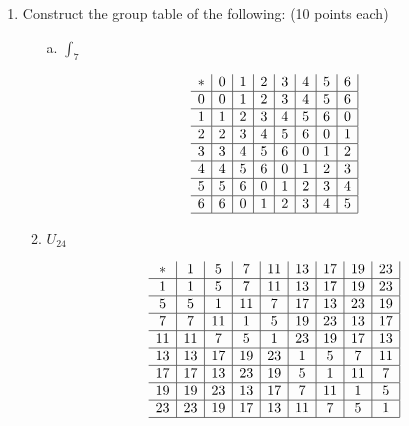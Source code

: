 \begin{enumerate}
\begin{enumerate}
    \end{enumerate}
    \item Construct the group table of the following: (10 points each)
    \begin{enumerate}
        \item[a.] \(\int_7\)

        \[
            \begin{array}{c|c|c|c|c|c|c|c|}
                * & 0 & 1 & 2 & 3 & 4 & 5 & 6 \\ \hline
                0 & 0 & 1 & 2 & 3 & 4 & 5 & 6 \\ \hline
                1 & 1 & 2 & 3 & 4 & 5 & 6 & 0 \\ \hline
                2 & 2 & 3 & 4 & 5 & 6 & 0 & 1 \\ \hline
                3 & 3 & 4 & 5 & 6 & 0 & 1 & 2 \\ \hline
                4 & 4 & 5 & 6 & 0 & 1 & 2 & 3 \\ \hline
                5 & 5 & 6 & 0 & 1 & 2 & 3 & 4 \\ \hline
                6 & 6 & 0 & 1 & 2 & 3 & 4 & 5 \\ \hline
            \end{array}
        \]

        \item \(U_{24}\)

        \[
            \begin{array}{c|c|c|c|c|c|c|c|c|}
                * & 1 & 5 & 7 & 11 & 13 & 17 & 19 & 23 \\ \hline
                1 & 1 & 5 & 7 & 11 & 13 & 17 & 19 & 23 \\ \hline
                5 & 5 & 1 & 11 & 7 & 17 & 13 & 23 & 19 \\ \hline
                7 & 7 & 11 & 1 & 5 & 19 & 23 & 13 & 17 \\ \hline
                11 & 11 & 7 & 5 & 1 & 23 & 19 & 17 & 13 \\ \hline
                13 & 13 & 17 & 19 & 23 & 1 & 5 & 7 & 11 \\ \hline
                17 & 17 & 13 & 23 & 19 & 5 & 1 & 11 & 7 \\ \hline
                19 & 19 & 23 & 13 & 17 & 7 & 11 & 1 & 5 \\ \hline
                23 & 23 & 19 & 17 & 13 & 11 & 7 & 5 & 1 \\ \hline
            \end{array}
        \]
    \end{enumerate}


\end{enumerate}

